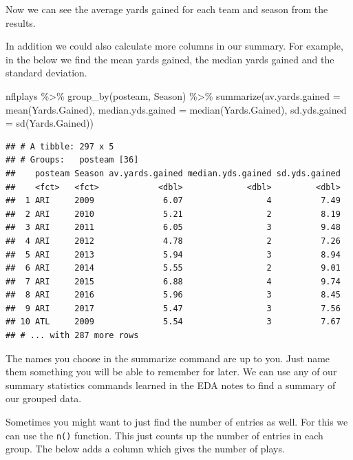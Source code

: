 \documentclass[
]{book}
\newenvironment{Shaded}{\begin{snugshade}}{\end{snugshade}}
\newcommand{\AttributeTok}[1]{\textcolor[rgb]{0.77,0.63,0.00}{#1}}
\newcommand{\FunctionTok}[1]{\textcolor[rgb]{0.00,0.00,0.00}{#1}}
\newcommand{\NormalTok}[1]{#1}
\newcommand{\SpecialCharTok}[1]{\textcolor[rgb]{0.00,0.00,0.00}{#1}}
\theoremstyle{definition}
\theoremstyle{definition}
\theoremstyle{definition}
\theoremstyle{definition}
\theoremstyle{remark}
\begin{document}
Now we can see the average yards gained for each team and season from the results.

In addition we could also calculate more columns in our summary. For example, in the below we find the mean yards gained, the median yards gained and the standard deviation.

\begin{Shaded}
\begin{Highlighting}[]
\NormalTok{nflplays }\SpecialCharTok{\%\textgreater{}\%}
    \FunctionTok{group\_by}\NormalTok{(posteam, Season) }\SpecialCharTok{\%\textgreater{}\%}
    \FunctionTok{summarize}\NormalTok{(}\AttributeTok{av.yards.gained =} \FunctionTok{mean}\NormalTok{(Yards.Gained), }\AttributeTok{median.yds.gained =} \FunctionTok{median}\NormalTok{(Yards.Gained),}
        \AttributeTok{sd.yds.gained =} \FunctionTok{sd}\NormalTok{(Yards.Gained))}
\end{Highlighting}
\end{Shaded}

\begin{verbatim}
## # A tibble: 297 x 5
## # Groups:   posteam [36]
##    posteam Season av.yards.gained median.yds.gained sd.yds.gained
##    <fct>   <fct>            <dbl>             <dbl>         <dbl>
##  1 ARI     2009              6.07                 4          7.49
##  2 ARI     2010              5.21                 2          8.19
##  3 ARI     2011              6.05                 3          9.48
##  4 ARI     2012              4.78                 2          7.26
##  5 ARI     2013              5.94                 3          8.94
##  6 ARI     2014              5.55                 2          9.01
##  7 ARI     2015              6.88                 4          9.74
##  8 ARI     2016              5.96                 3          8.45
##  9 ARI     2017              5.47                 3          7.56
## 10 ATL     2009              5.54                 3          7.67
## # ... with 287 more rows
\end{verbatim}

The names you choose in the summarize command are up to you. Just name them something you will be able to remember for later. We can use any of our summary statistics commands learned in the EDA notes to find a summary of our grouped data.

Sometimes you might want to just find the number of entries as well. For this we can use the \texttt{n()} function. This just counts up the number of entries in each group. The below adds a column which gives the number of plays.
\end{document}
